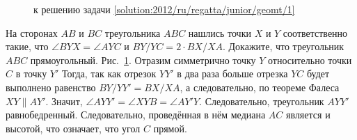 \ifsolution
\begin{figure}\centering
    \caption{к решению задачи \ref{solution:2012/ru/regatta/junior/geomt/1}}
    \label{fig:solution:2012/ru/regatta/junior/geomt/1}
\end{figure}%
\fi %

\problem
На сторонах $AB$ и $BC$ треугольника $ABC$ нашлись точки $X$ и $Y$
соответственно такие, что
$\angle BYX = \angle AYC$ и $BY / YC = 2 \cdot BX / XA$.
Докажите, что треугольник $ABC$ прямоугольный.
\solution
\label{solution:2012/ru/regatta/junior/geomt/1}%
Рис.~\ref{fig:solution:2012/ru/regatta/junior/geomt/1}.
Отразим симметрично точку $Y$ относительно точки $C$ в точку $Y'$
Тогда, так как отрезок $YY'$ в два раза больше отрезка $YC$ будет выполнено
равенство $BY / YY' = BX / XA$, а следовательно, по теореме
Фалеса $XY \parallel AY'$.
Значит, $\angle AYY' = \angle XYB = \angle AY'Y$.
Следовательно, треугольник $AYY'$ равнобедренный.
Следовательно, проведённая в нём медиана $AC$ является и высотой,
что означает, что угол $C$ прямой.
\endproblem

